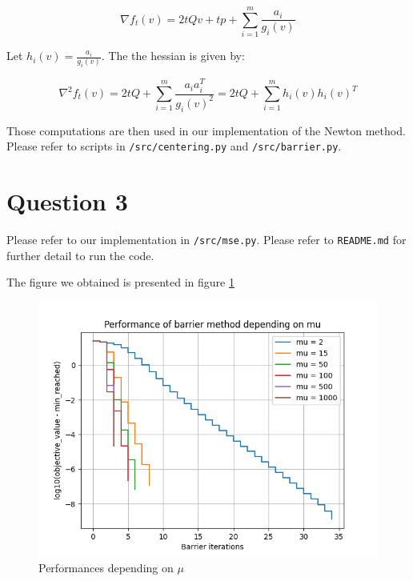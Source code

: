 \documentclass[a4paper]{article}
\begin{document}
$$
\nabla f_t(v) = 2tQv + tp + \sum_{i=1}^m \frac{a_i}{g_i(v)}
$$

Let $h_i(v) = \frac{a_i}{g_i(v)}$. The the hessian is given by:

$$
\nabla^2f_t(v) = 2tQ + \sum_{i=1}^m\frac{a_ia_i^T}{g_i(v)^2} = 2tQ + \sum_{i=1}^m h_i(v)h_i(v)^T
$$

Those computations are then used in our implementation of the Newton method. Please refer to scripts in \texttt{/src/centering.py} and \texttt{/src/barrier.py}.

\section{Question 3}

Please refer to our implementation in \texttt{/src/mse.py}. Please refer to \texttt{README.md} for further detail to run the code.

The figure we obtained is presented in figure \ref{fig:muComp}

\begin{figure}[!h]
    \centering
	\includegraphics[width=1\textwidth]{figures/mu_performances.png}
	\caption{Performances depending on $\mu$ \label{fig:muComp}}
\end{figure}



%
\end{document}
